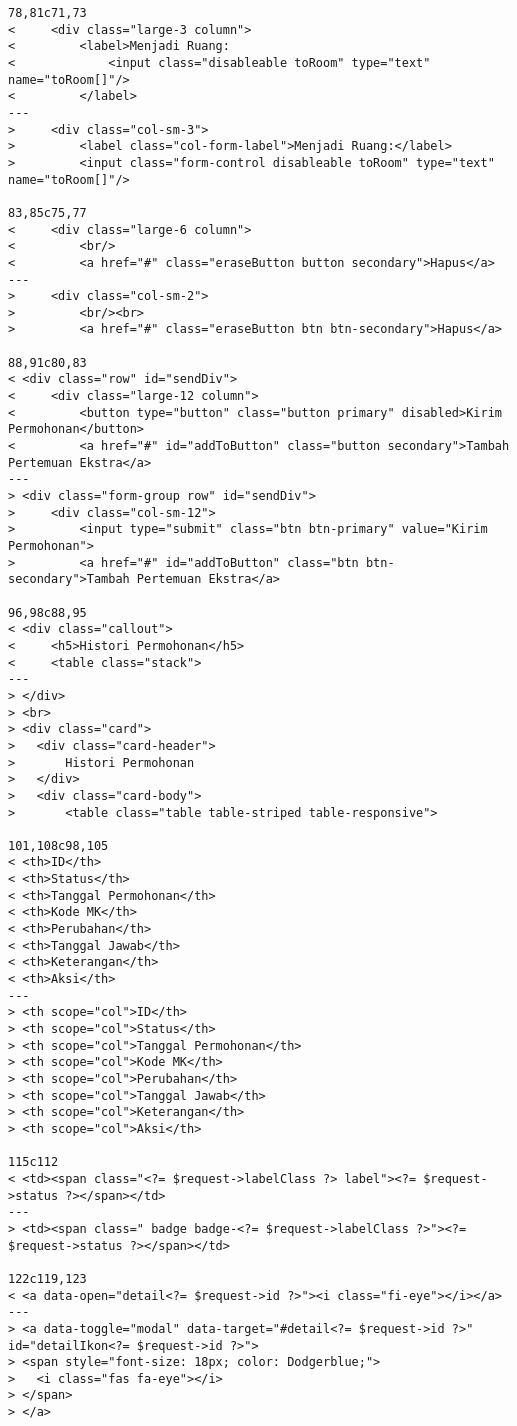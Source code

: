 \begin{lstlisting}
78,81c71,73
<     <div class="large-3 column">
<         <label>Menjadi Ruang:
<             <input class="disableable toRoom" type="text" name="toRoom[]"/>
<         </label>
---
>     <div class="col-sm-3">
>         <label class="col-form-label">Menjadi Ruang:</label>
>         <input class="form-control disableable toRoom" type="text" name="toRoom[]"/>

83,85c75,77
<     <div class="large-6 column">
<         <br/>
<         <a href="#" class="eraseButton button secondary">Hapus</a>
---
>     <div class="col-sm-2">
>         <br/><br>
>         <a href="#" class="eraseButton btn btn-secondary">Hapus</a>

88,91c80,83
< <div class="row" id="sendDiv">
<     <div class="large-12 column">
<         <button type="button" class="button primary" disabled>Kirim Permohonan</button>
<         <a href="#" id="addToButton" class="button secondary">Tambah Pertemuan Ekstra</a>
---
> <div class="form-group row" id="sendDiv">
>     <div class="col-sm-12">
>         <input type="submit" class="btn btn-primary" value="Kirim Permohonan">
>         <a href="#" id="addToButton" class="btn btn-secondary">Tambah Pertemuan Ekstra</a>

96,98c88,95
< <div class="callout">
<     <h5>Histori Permohonan</h5>
<     <table class="stack">
---
> </div>
> <br>
> <div class="card">
> 	<div class="card-header">
> 	    Histori Permohonan
> 	</div>
> 	<div class="card-body">
> 	    <table class="table table-striped table-responsive">

101,108c98,105
< <th>ID</th>
< <th>Status</th>
< <th>Tanggal Permohonan</th>
< <th>Kode MK</th>
< <th>Perubahan</th>
< <th>Tanggal Jawab</th>
< <th>Keterangan</th>
< <th>Aksi</th>
---
> <th scope="col">ID</th>
> <th scope="col">Status</th>
> <th scope="col">Tanggal Permohonan</th>
> <th scope="col">Kode MK</th>
> <th scope="col">Perubahan</th>
> <th scope="col">Tanggal Jawab</th>
> <th scope="col">Keterangan</th>
> <th scope="col">Aksi</th>

115c112
< <td><span class="<?= $request->labelClass ?> label"><?= $request->status ?></span></td>
---
> <td><span class=" badge badge-<?= $request->labelClass ?>"><?= $request->status ?></span></td>

122c119,123
< <a data-open="detail<?= $request->id ?>"><i class="fi-eye"></i></a>
---
> <a data-toggle="modal" data-target="#detail<?= $request->id ?>" id="detailIkon<?= $request->id ?>">
> <span style="font-size: 18px; color: Dodgerblue;">
> 	<i class="fas fa-eye"></i>
> </span>
> </a>


\end{lstlisting}
